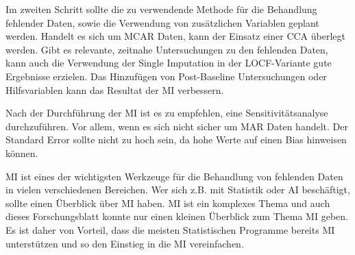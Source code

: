 Im zweiten Schritt sollte die zu verwendende Methode für die Behandlung fehlender Daten, sowie die Verwendung von zusätzlichen Variablen geplant 
werden. 
Handelt es sich um MCAR Daten, kann der Einsatz einer CCA überlegt werden. Gibt es relevante, zeitnahe Untersuchungen 
zu den fehlenden Daten, kann auch die Verwendung der Single Imputation in der LOCF-Variante gute Ergebnisse erzielen. 
Das Hinzufügen von Post-Baseline Untersuchungen oder Hilfsvariablen kann das Resultat der MI verbessern. 

Nach der Durchführung der MI ist es zu empfehlen, eine Sensitivitätsanalyse durchzuführen. Vor allem, wenn es sich nicht 
sicher um MAR Daten handelt. Der Standard Error sollte nicht zu hoch sein, da hohe Werte auf einen Bias hinweisen können.

MI ist eines der wichtigsten Werkzeuge für die Behandlung von fehlenden Daten in vielen verschiedenen Bereichen. 
Wer sich z.B. mit Statistik oder AI beschäftigt, sollte einen Überblick über MI haben. MI ist ein komplexes Thema und 
auch dieses Forschungsblatt konnte nur einen kleinen Überblick zum Thema MI geben. Es ist daher von Vorteil, dass die 
meisten Statistischen Programme bereits MI unterstützen und so den Einstieg in die MI vereinfachen. 


